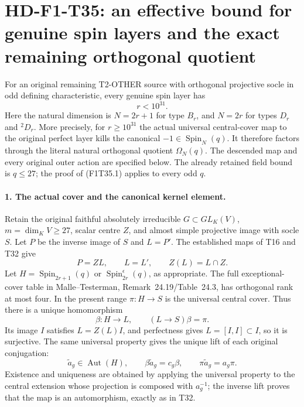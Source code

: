 \section[HD-F1-T35: effective genuine-spin rank bound]{HD-F1-T35: an effective bound for genuine spin layers and the exact remaining orthogonal quotient}
\label{sec:f1-genuine-spin-large-rank-exclusion}

For an original remaining T2-OTHER source with
orthogonal projective socle in odd defining
characteristic, every genuine spin layer has
\[
                  \boxed{\qquad r<10^{31}.\qquad}
 \tag{F1T35.1}
\]
Here the natural dimension is \(N=2r+1\) for type
\(B_r\), and \(N=2r\) for types \(D_r\) and
\({}^{2}D_r\). More precisely, for \(r\ge10^{31}\)
the actual universal central-cover map to the
original perfect layer kills the canonical
\(-1\in\operatorname{Spin}_N(q)\). It therefore
factors through the literal natural orthogonal
quotient \(\Omega_N(q)\). The descended map and
every original outer action are specified below.
The already retained field bound is \(q\le27\);
the proof of (F1T35.1) applies to every odd \(q\).

\paragraph{1. The actual cover and the canonical kernel element.}
Retain the original faithful absolutely irreducible
\(G\subset GL_K(V)\), \(m=\dim_KV\ge27\), scalar
centre \(Z\), and almost simple projective image
with socle \(S\). Let \(P\) be the inverse image
of \(S\) and \(L=P'\). The established maps of
T16 and T32 give
\[
          P=ZL,\qquad L=L',\qquad Z(L)=L\cap Z.
 \tag{F1T35.2}
\]
Let \(H=\operatorname{Spin}_{2r+1}(q)\) or
\(\operatorname{Spin}^{\epsilon}_{2r}(q)\), as
appropriate. The full exceptional-cover table in
Malle--Testerman, Remark~24.19/Table~24.3, has
orthogonal rank at most four. In the present range
\(\pi:H\to S\) is the universal central cover.
Thus there is a unique homomorphism
\[
 \beta:H\longrightarrow L,
 \qquad (L\longrightarrow S)\beta=\pi.
 \tag{F1T35.3}
\]
Its image \(I\) satisfies \(L=Z(L)I\), and
perfectness gives \(L=[I,I]\subset I\), so it is
surjective. The same universal property gives the
unique lift of each original conjugation:
\[
 \widetilde a_g\in\operatorname{Aut}(H),
 \qquad \beta\widetilde a_g=c_g\beta,
 \qquad \pi\widetilde a_g=a_g\pi.
 \tag{F1T35.4}
\]
Existence and uniqueness are obtained by applying
the universal property to the central extension
whose projection is composed with \(a_g^{-1}\);
the inverse lift proves that the map is an
automorphism, exactly as in T32.

